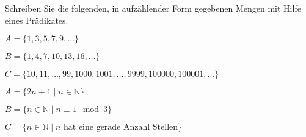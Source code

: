 Schreiben Sie die folgenden, in aufzählender Form gegebenen Mengen mit
Hilfe eines Prädikates.
\begin{teilaufgaben}
\item
$A=\{1,3,5,7,9,\dots\}$
\item
$B=\{1,4,7,10,13,16,\dots\}$
\item
$C=\{10,11,\dots,99,1000,1001,\dots,9999,100000,100001,\dots\}$
\end{teilaufgaben}

\begin{loesung}
\begin{teilaufgaben}
\item
$A=\{2n+1\mid n\in\mathbb{N}\}$
\item
$B=\{ n\in\mathbb{N}\mid n\equiv 1\mod 3\}$
\item
$C=\{n\in\mathbb{N}\mid \text{$n$ hat eine gerade Anzahl Stellen}\}$
\qedhere
\end{teilaufgaben}
\end{loesung}
